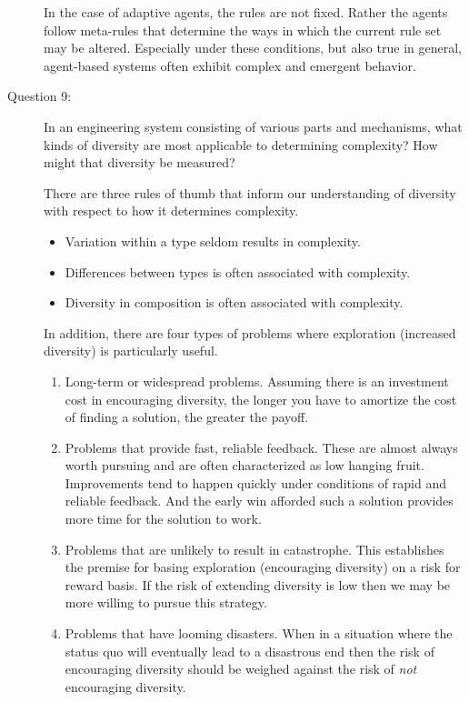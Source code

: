 \documentclass[letterpaper,10pt]{article}
\begin{document}
\begin{description}
In the case of adaptive agents, the rules are not fixed.  Rather the agents follow meta-rules that determine the ways in which the current rule set may be altered.  Especially under these conditions, but also true in general, agent-based systems often exhibit complex and emergent behavior.

\item[Question 9:]
In an engineering system consisting of various parts and mechanisms, what kinds of diversity are most applicable to determining complexity?  How might that diversity be measured?

There are three rules of thumb that inform our understanding of diversity with respect to how it determines complexity.
\begin{itemize}
  \item Variation within a type seldom results in complexity.
  \item Differences between types is often associated with complexity.
  \item Diversity in composition is often associated with complexity.
\end{itemize}

In addition, there are four types of problems where exploration (increased diversity) is particularly useful.
\begin{enumerate}
  \item Long-term or widespread problems.  Assuming there is an investment cost in encouraging diversity, the longer you have to amortize the cost of finding a solution, the greater the payoff.
  \item Problems that provide fast, reliable feedback.  These are almost always worth pursuing and are often characterized as low hanging fruit.  Improvements tend to happen quickly under conditions of rapid and reliable feedback.  And the early win afforded such a solution provides more time for the solution to work.
  \item Problems that are unlikely to result in catastrophe.  This establishes the premise for basing exploration (encouraging diversity) on a risk for reward basis.  If the risk of extending diversity is low then we may be more willing to pursue this strategy.
  \item Problems that have looming disasters. When in a situation where the status quo will eventually lead to a disastrous end then the risk of encouraging diversity should be weighed against the risk of \emph{not} encouraging diversity.
\end{enumerate}


\end{description}
\end{document}
